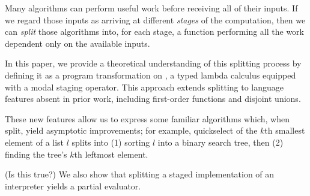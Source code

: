 Many algorithms can perform useful work before receiving all of their inputs.
If we regard those inputs as arriving at different \emph{stages} of the
computation, then we can \emph{split} those algorithms into, for each stage, a
function performing all the work dependent only on the available inputs.

In this paper, we provide a theoretical understanding of this splitting process
by defining it as a program transformation on \lang, a typed lambda calculus
equipped with a modal staging operator. This approach extends splitting to
language features absent in prior work, including first-order functions and
disjoint unions.

These new features allow us to express some familiar algorithms which, when
split, yield asymptotic improvements; for example, quickselect of the $k$th
smallest element of a list $l$ splits into (1) sorting $l$ into a binary search
tree, then (2) finding the tree's $k$th leftmost element.

\TODO (Is this true?)
We also show that splitting a staged implementation of an interpreter yields a
partial evaluator.




